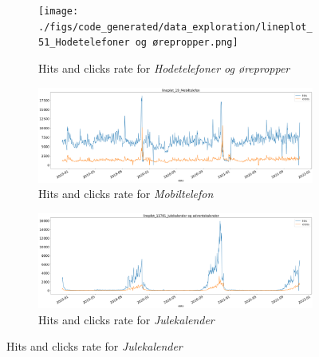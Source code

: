\begin{figure}[h!]
  \centering
  \caption{Category plots of hits and click rate from 2019-2021}
  \label{fig:lineplot1}
  \begin{subfigure}[b]{\textwidth}
    \texttt{[image: ./figs/code\_generated/data\_exploration/lineplot\_51\_Hodetelefoner og ørepropper.png]}
    \hfill
    \caption{Hits and clicks rate for \textit{Hodetelefoner og ørepropper}}
    \label{fig:lineplot-Hodetelefoner}
  \end{subfigure}

  \begin{subfigure}[b]{\textwidth}
    \includegraphics[width=\textwidth]{./figs/code_generated/data_exploration/lineplot_19_Mobiltelefon.png}
    \hfill
    \caption{Hits and clicks rate for \textit{Mobiltelefon}}
    \label{fig:lineplot-Mobiltelefon}
  \end{subfigure}

  \begin{subfigure}[b]{\textwidth}
    \includegraphics[width=\textwidth]{./figs/code_generated/data_exploration/lineplot_11781_Julekalender og adventskalender.png}
    \hfill
    \caption{Hits and clicks rate for \textit{Julekalender}}
    \label{fig:lineplot-Julekalender}
  \end{subfigure}
\end{figure}

